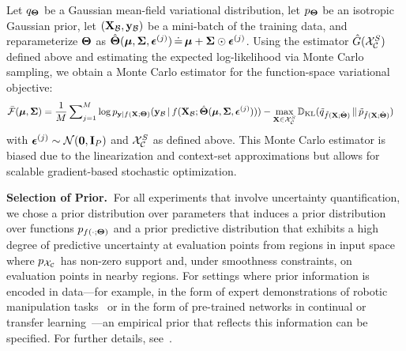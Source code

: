 Let $q_{\boldsymbol{\Theta}}$ be a Gaussian mean-field variational distribution,  let $p_{\boldsymbol{\Theta}}$ be an isotropic Gaussian prior, let $(\mathbf X_{\mathcal{B}}, \mathbf y_{\mathcal{B}})$ be a mini-batch of the training data, and reparameterize $\boldsymbol{\Theta}$ as $\hat{\boldsymbol{\Theta}}({\boldsymbol{\mu}}, \boldsymbol\Sigma, \boldsymbol{\epsilon}^{(j)}) \,\dot{=}\, {\boldsymbol{\mu}} + \boldsymbol\Sigma \odot \boldsymbol{\epsilon}^{(j)}$.
Using the estimator $ \hat{G}(\mathcal{X}_{\mathcal{C}}^{S})$ defined above and estimating the expected log-likelihood via Monte Carlo sampling, we obtain a Monte Carlo estimator for the function-space variational objective:
\begin{align}
%
%
\label{eq:variational_objective_diag}
    &
    \bar{\calF}(\bmu, \bSigma)
    =
    \frac{1}{M} \sum\nolimits_{j=1}^{M} \log p_{\by | f(\bX ; \bTheta)}(\by_{\calB} \vbar f(\bX_{\calB} ; \hat{\bTheta}(\bmu, \bSigma, \bepsilon^{(j)})) )
    - \max_{ \bX \in  \calX_{\calC}^{S} } {\DD_\textrm{KL}(\qtilde_{\ftilde(\bX ; \hat{\bTheta})} \,\|\, \ptilde_{\ftilde(\bX ; \hat{\bTheta})})}
%
\end{align}
with $\boldsymbol{\epsilon}^{(j)} \sim \mathcal{N}(\mathbf{0}, \mathbf{I}_{P})$ and \mbox{$\mathcal{X}_{\mathcal{C}}^{S}$} as defined above.
This Monte Carlo estimator is biased due to the linearization and context-set approximations but allows for scalable gradient-based stochastic optimization.
%
%

\textbf{Selection of Prior.}$~$
For all experiments that involve uncertainty quantification, we chose a prior distribution over parameters that induces a prior distribution over functions $p_{f(\cdot ; \boldsymbol{\Theta})}$ and a prior predictive distribution that exhibits a high degree of predictive uncertainty at evaluation points from regions in input space where $p_{\mathcal{X}_{\mathcal{C}}}$ has non-zero support and, under smoothness constraints, on evaluation points in nearby regions.
For settings where prior information is encoded in data---for example, in the form of expert demonstrations of robotic manipulation tasks~\citep{rudner2021pathologies} or in the form of pre-trained networks in continual or transfer learning~\citep{Rudner2022sfsvi}---an empirical prior that reflects this information can be specified.
For further details, see~.
%


